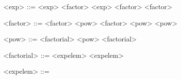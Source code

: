 \begin{grammarEx}
	<exp> ::= <exp> \lit{+} <factor>
	\alt <exp> \lit{-} <factor>
	\alt <factor>

	<factor> ::= <factor> \lit{*} <pow>
	\alt <factor> \lit{/} <pow>
	\alt <pow>

	<pow> ::= <factorial> \lit{\^{}} <pow>
	\alt <factorial>

	<factorial> ::= <exp\textunderscore elem> \lit{!}
	\alt <exp\textunderscore elem>

	<exp\textunderscore elem> ::= 
	\alt {}
\end{grammarEx}